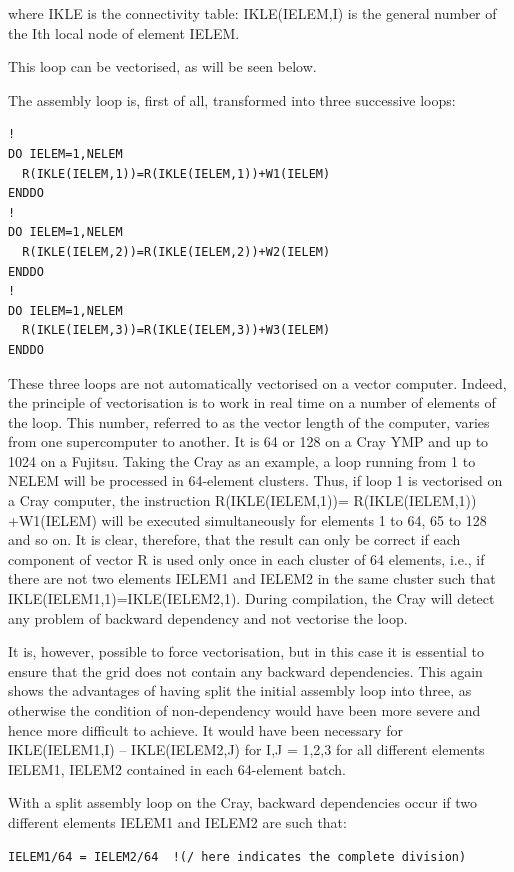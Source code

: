 where IKLE is the connectivity table: IKLE(IELEM,I) is the general number of
the Ith local node of element IELEM.

This loop can be vectorised, as will be seen below.

The assembly loop is, first of all, transformed into three successive loops:

\begin{lstlisting}[language=TelFortran]
!
DO IELEM=1,NELEM
  R(IKLE(IELEM,1))=R(IKLE(IELEM,1))+W1(IELEM)
ENDDO
!
DO IELEM=1,NELEM
  R(IKLE(IELEM,2))=R(IKLE(IELEM,2))+W2(IELEM)
ENDDO
!
DO IELEM=1,NELEM
  R(IKLE(IELEM,3))=R(IKLE(IELEM,3))+W3(IELEM)
ENDDO
\end{lstlisting}

These three loops are not automatically vectorised on a vector computer.
Indeed, the principle of vectorisation is to work in real time on a number of
elements of the loop. This number, referred to as the vector length of the
computer, varies from one supercomputer to another. It is 64 or 128 on a Cray
YMP and up to 1024 on a Fujitsu. Taking the Cray as an example, a loop running
from 1 to NELEM will be processed in 64-element clusters. Thus, if loop 1 is
vectorised on a Cray computer, the instruction R(IKLE(IELEM,1))=
R(IKLE(IELEM,1)) +W1(IELEM) will be executed simultaneously for elements 1 to
64, 65 to 128 and so on. It is clear, therefore, that the result can only be
correct if each component of vector R is used only once in each cluster of 64
elements, i.e., if there are not two elements IELEM1 and IELEM2 in the same
cluster such that IKLE(IELEM1,1)=IKLE(IELEM2,1). During compilation, the Cray
will detect any problem of backward dependency and not vectorise the loop.

It is, however, possible to force vectorisation, but in this case it is
essential to ensure that the grid does not contain any backward dependencies.
This again shows the advantages of having split the initial assembly loop into
three, as otherwise the condition of non-dependency would have been more severe
and hence more difficult to achieve. It would have been necessary for
IKLE(IELEM1,I) -- IKLE(IELEM2,J) for I,J = 1,2,3 for all different elements
IELEM1, IELEM2 contained in each 64-element batch.

With a split assembly loop on the Cray, backward dependencies occur if two
different elements IELEM1 and IELEM2 are such that:

\begin{lstlisting}[language=TelFortran]
IELEM1/64 = IELEM2/64  !(/ here indicates the complete division)
\end{lstlisting}

